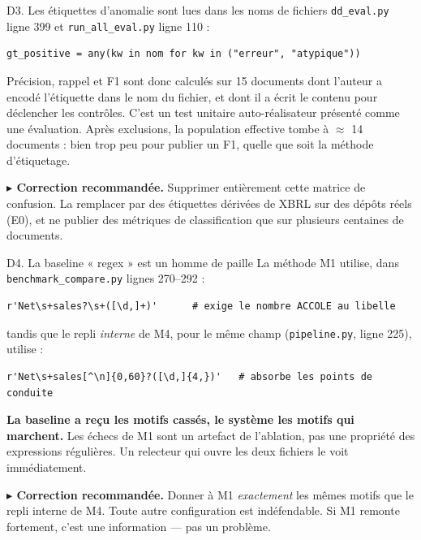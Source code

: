 \documentclass[11pt,a4paper]{article}
\newcommand{\corr}[1]{%
  \par\vspace{4pt}%
  \noindent\textbf{\textcolor{cExp}{$\blacktriangleright$ Correction recommandée.}} #1%
}
\newcommand{\fic}[1]{\texttt{\small #1}}
\begin{document}
\begin{fatal}{D3. Les étiquettes d'anomalie sont lues dans les noms de fichiers}
\fic{dd\_eval.py} ligne 399 et \fic{run\_all\_eval.py} ligne 110 :
\begin{lstlisting}
gt_positive = any(kw in nom for kw in ("erreur", "atypique"))
\end{lstlisting}

Précision, rappel et F1 sont donc calculés sur 15 documents dont l'auteur a
encodé l'étiquette dans le nom du fichier, et dont il a écrit le contenu pour
déclencher les contrôles. C'est un test unitaire auto-réalisateur présenté comme
une évaluation. Après exclusions, la population effective tombe à
$\approx$ 14 documents : bien trop peu pour publier un F1, quelle que soit la
méthode d'étiquetage.

\corr{Supprimer entièrement cette matrice de confusion. La remplacer par des
étiquettes dérivées de XBRL sur des dépôts réels (E0), et ne publier des
métriques de classification que sur plusieurs centaines de documents.}
\end{fatal}

\begin{fatal}{D4. La baseline « regex » est un homme de paille}
La méthode M1 utilise, dans \fic{benchmark\_compare.py} lignes 270--292 :
\begin{lstlisting}
r'Net\s+sales?\s+([\d,]+)'      # exige le nombre ACCOLE au libelle
\end{lstlisting}
tandis que le repli \emph{interne} de M4, pour le même champ
(\fic{pipeline.py}, ligne 225), utilise :
\begin{lstlisting}
r'Net\s+sales[^\n]{0,60}?([\d,]{4,})'   # absorbe les points de conduite
\end{lstlisting}

\textbf{La baseline a reçu les motifs cassés, le système les motifs qui
marchent.} Les échecs de M1 sont un artefact de l'ablation, pas une propriété
des expressions régulières. Un relecteur qui ouvre les deux fichiers le voit
immédiatement.

\corr{Donner à M1 \emph{exactement} les mêmes motifs que le repli interne de M4.
Toute autre configuration est indéfendable. Si M1 remonte fortement, c'est une
information — pas un problème.}
\end{fatal}
\end{document}
